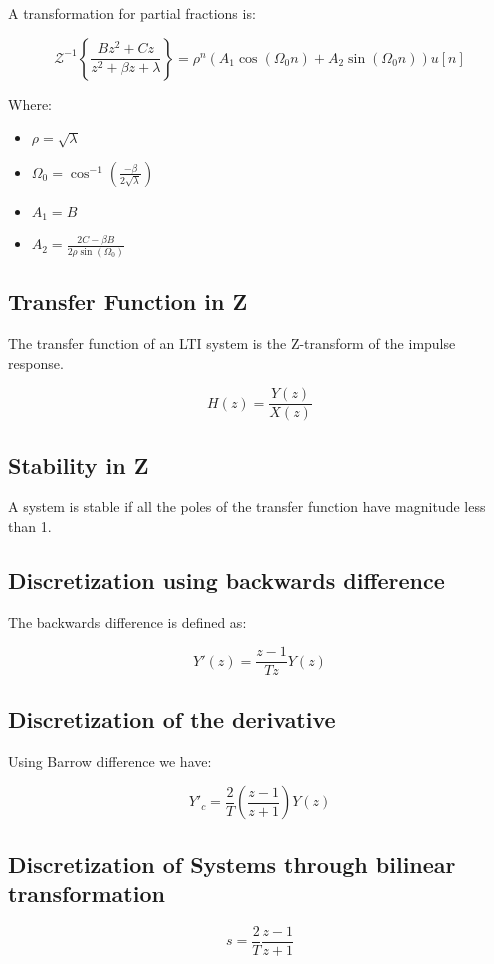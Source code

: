 \documentclass[letterpaper]{article}
\begin{document}
\begin{multicols}{2}
        A transformation for partial fractions is:

        \[\mathcal{Z}^{-1} \left\{ \frac{Bz^2 + Cz}{z^2 + \beta z + \lambda} \right\} = \rho^n \left( A_1 \cos{(\Omega_0 n)} + A_2 \sin{(\Omega_0 n)} \right) u[n]\]

        Where:

        \begin{itemize}
            \item $\rho = \sqrt{\lambda}$
            \item $\Omega_0 = \cos^{-1}{\left( \frac{- \beta}{2 \sqrt{\lambda}} \right)}$
            \item $A_1 = B$
            \item $A_2 = \frac{2C - \beta B}{2 \rho \sin{(\Omega_0)}}$
        \end{itemize}

        \subsection{Transfer Function in Z}

        The transfer function of an LTI system is the Z-transform of the impulse response.

        \[H(z) = \frac{Y(z)}{X(z)}\]

        \subsection{Stability in Z}

        A system is stable if all the poles of the transfer function have magnitude less than 1.

        \subsection{Discretization using backwards difference}

        The backwards difference is defined as:

        \[Y'(z) = \frac{z - 1}{Tz} Y(z)\]

        \subsection{Discretization of the derivative}

        Using Barrow difference we have:

        \[Y'_c = \frac{2}{T} \left(\frac{z - 1}{z + 1}\right) Y(z)\]

        \subsection{Discretization of Systems through bilinear transformation}

        \[s = \frac{2}{T} \frac{z - 1}{z + 1}\]
    \end{multicols}
\end{document}
